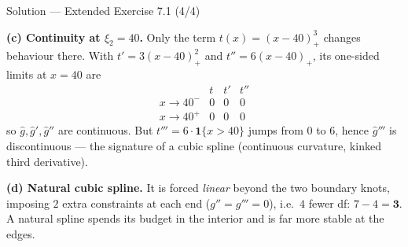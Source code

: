 \documentclass[aspectratio=169,11pt]{beamer}
\begin{document}
\begin{frame}{Solution --- Extended Exercise 7.1 (4/4)}
\begin{solutionbox}
\textbf{(c) Continuity at $\xi_2=40$.} Only the term $t(x)=(x-40)^3_+$ changes behaviour there. With $t'=3(x-40)^2_+$ and $t''=6(x-40)_+$, its one-sided limits at $x=40$ are
\[
\begin{array}{c|ccc}
 & t & t' & t'' \\\hline
x\to40^- & 0 & 0 & 0\\
x\to40^+ & 0 & 0 & 0
\end{array}
\]
so $\hat g,\hat g',\hat g''$ are continuous. But $t'''=6\cdot\mathbf{1}\{x>40\}$ jumps from $0$ to $6$, hence $\hat g'''$ is discontinuous --- the signature of a cubic spline (continuous curvature, kinked third derivative).

\medskip
\textbf{(d) Natural cubic spline.} It is forced \emph{linear} beyond the two boundary knots, imposing $2$ extra constraints at each end ($g''=g'''=0$), i.e.\ $4$ fewer df: $7-4=\mathbf{3}$. A natural spline spends its budget in the interior and is far more stable at the edges.
\end{solutionbox}
\end{frame}
\end{document}
